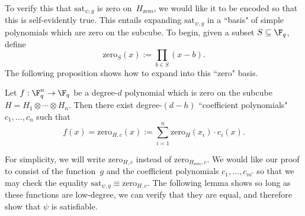 To verify this that $\mathrm{sat}_{\psi,g}$ is zero on~$H_{\mathrm{zero}}$, we would like it to be encoded so that this is self-evidently true.
This entails expanding $\mathrm{sat}_{\psi,g}$ in a ``basis" of simple polynomials which are zero on the subcube.
To begin, given a subset $S \subseteq \F_q$, define
\begin{equation*}
\mathrm{zero}_S(x) := \prod_{b \in S}(x-b).
\end{equation*}
The following proposition shows how to expand into this ``zero" basis.
\begin{proposition}\label{prop:coefficient-polys}
Let $f:\F_q^{n} \rightarrow \F_q$ be a degree-$d$ polynomial which is zero on the subcube $H = H_1 \otimes \cdots \otimes H_n$. Then there exist degree-$(d-h)$ ``coefficient polynomials" $c_1, \ldots, c_n$ such that
\begin{equation*}
f(x) = \mathrm{zero}_{H,c}(x):= \sum_{i=1}^{n} \mathrm{zero}_H(x_i) \cdot c_i(x).
\end{equation*}
\end{proposition}

For simplicity, we will write $\mathrm{zero}_{H,c}$ instead of $\mathrm{zero}_{H_{\mathrm{zero}},c}$.
We would like our proof to consist of the function~$g$ and the coefficient polynomials $c_1,\ldots, c_{m'}$ so that we may check the equality
$\mathrm{sat}_{\psi,g} \equiv \mathrm{zero}_{H,c}$.
The following lemma shows so long as these functions are low-degree,
we can verify that they are equal, and therefore show that $\psi$ is satisfiable.

